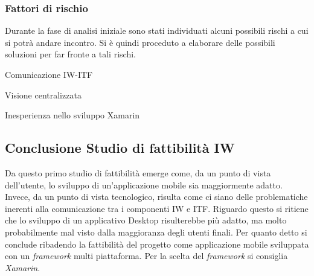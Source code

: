 \subsubsection{Fattori di rischio}
Durante la fase di analisi iniziale sono stati individuati alcuni possibili rischi a cui si potrà andare incontro.
Si è quindi proceduto a elaborare delle possibili soluzioni per far fronte a tali rischi.\\


\begin{risk}{Comunicazione IW-ITF}
    \label{risk:comunication-iw-itf} 
\end{risk}
\begin{risk}{Visione centralizzata}
    \label{risk:centralization-vision-from-user} 
\end{risk}
\begin{risk}{Inesperienza nello sviluppo Xamarin}
    \label{risk:mobile-inex} 
\end{risk}
\subsection{Conclusione Studio di fattibilità IW}
Da questo primo studio di fattibilità emerge come, da un punto di vista dell’utente, lo sviluppo di un’applicazione mobile sia maggiormente adatto. Invece, da un punto di vista tecnologico, risulta come ci siano delle problematiche inerenti alla comunicazione tra i componenti IW e ITF. Riguardo questo si ritiene che lo sviluppo di un applicativo Desktop risulterebbe più adatto, ma molto probabilmente mal visto dalla maggioranza degli utenti finali. 
Per quanto detto si conclude ribadendo la fattibilità del progetto come applicazione mobile sviluppata con un \emph{framework} multi piattaforma. Per la scelta del \emph{framework} si consiglia \emph{Xamarin}.
